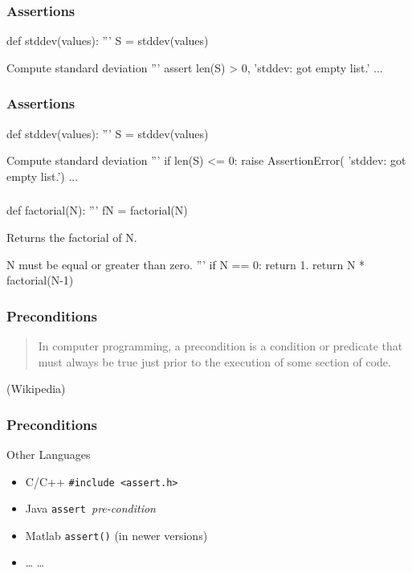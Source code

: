 \begin{frame}[fragile]
\frametitle{Assertions}
\begin{python}
def stddev(values):
    '''
    S = stddev(values)

    Compute standard deviation
    '''
    assert len(S) > 0, 'stddev: got empty list.'
    ...
\end{python}
\end{frame}

\begin{frame}[fragile]
\frametitle{Assertions}

\begin{python}
def stddev(values):
    '''
    S = stddev(values)

    Compute standard deviation
    '''
    if len(S) <= 0:
        raise AssertionError(
            'stddev: got empty list.')
    ...
\end{python}

\end{frame}

\begin{frame}[fragile]
\frametitle{}

\begin{python}
def factorial(N):
    '''
    fN = factorial(N)

    Returns the factorial of N.

    N must be equal or greater than zero.
    '''
    if N == 0:
        return 1.
    return N * factorial(N-1)
\end{python}
\end{frame}

\begin{frame}[fragile]
\frametitle{Preconditions}

\begin{quote}
In computer programming, a precondition is a condition or predicate that must always be true just prior to the execution of some section of code.
\end{quote}

\begin{flushright}
(Wikipedia)
\end{flushright}

\end{frame}

\begin{frame}[fragile]
\frametitle{Preconditions}
\begin{block}{Other Languages}
\begin{itemize}
\item \alert{C/C++} \lstinline{#include <assert.h>}
\item \alert{Java} \lstinline{assert }\textit{pre-condition}
\item \alert{Matlab} \lstinline{assert()} (in newer versions)
\item \alert{\ldots} \ldots
\end{itemize}
\end{block}
\end{frame}

